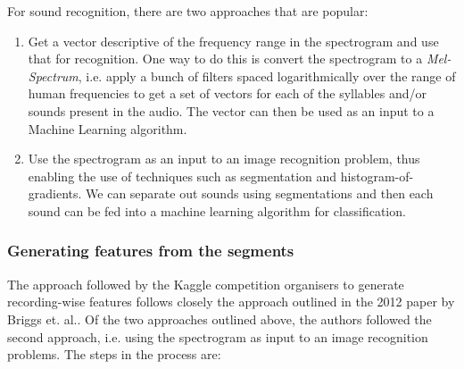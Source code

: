 \documentclass[11pt]{article}
\begin{document}
For sound recognition, there are two approaches that are popular:

\begin{enumerate}
\item Get a vector descriptive of the frequency range in the spectrogram and use that for recognition. One way to do this is convert the spectrogram to a \textit{Mel-Spectrum}, i.e. apply a bunch of filters spaced logarithmically over the range of human frequencies to get a set of vectors for each of the syllables and/or sounds present in the audio. The vector can then be used as an input to a Machine Learning algorithm.
\item Use the spectrogram as an input to an image recognition problem, thus enabling the use of techniques such as segmentation and histogram-of-gradients. We can separate out sounds using segmentations and then each sound can be fed into a machine learning algorithm for classification.
\end{enumerate}

\subsubsection{Generating features from the segments}

The approach followed by the Kaggle competition organisers to generate recording-wise features follows closely the approach outlined in the 2012 paper by Briggs et. al.\cite{briggs-2012}. Of the two approaches outlined above, the authors followed the second approach, i.e. using the spectrogram as input to an image recognition problems. The steps in the process are:
\end{document}
